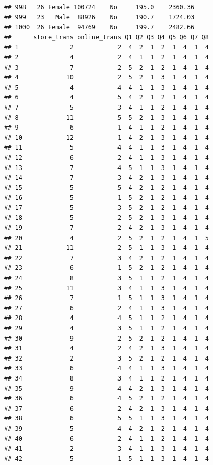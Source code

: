 \documentclass[12pt,]{krantz}
\theoremstyle{definition}
\theoremstyle{definition}
\theoremstyle{remark}
\begin{document}
\begin{verbatim}
## 998   26 Female 100724    No     195.0    2360.36
## 999   23   Male  88926    No     190.7    1724.03
## 1000  26 Female  94769    No     199.7    2482.66
##      store_trans online_trans Q1 Q2 Q3 Q4 Q5 Q6 Q7 Q8
## 1              2            2  4  2  1  2  1  4  1  4
## 2              4            2  4  1  1  2  1  4  1  4
## 3              7            2  5  2  1  2  1  4  1  4
## 4             10            2  5  2  1  3  1  4  1  4
## 5              4            4  4  1  1  3  1  4  1  4
## 6              4            5  4  2  1  2  1  4  1  4
## 7              5            3  4  1  1  2  1  4  1  4
## 8             11            5  5  2  1  3  1  4  1  4
## 9              6            1  4  1  1  2  1  4  1  4
## 10            12            1  4  2  1  3  1  4  1  4
## 11             5            4  4  1  1  3  1  4  1  4
## 12             6            2  4  1  1  3  1  4  1  4
## 13             7            4  5  1  1  3  1  4  1  4
## 14             7            3  4  2  1  3  1  4  1  4
## 15             5            5  4  2  1  2  1  4  1  4
## 16             5            1  5  2  1  2  1  4  1  4
## 17             5            3  5  2  1  2  1  4  1  4
## 18             5            2  5  2  1  3  1  4  1  4
## 19             7            2  4  2  1  3  1  4  1  4
## 20             4            2  5  2  1  2  1  4  1  5
## 21            11            2  5  1  1  3  1  4  1  4
## 22             7            3  4  2  1  2  1  4  1  4
## 23             6            1  5  2  1  2  1  4  1  4
## 24             8            3  5  1  1  2  1  4  1  4
## 25            11            3  4  1  1  3  1  4  1  4
## 26             7            1  5  1  1  3  1  4  1  4
## 27             6            2  4  1  1  3  1  4  1  4
## 28             4            4  5  1  1  2  1  4  1  4
## 29             4            3  5  1  1  2  1  4  1  4
## 30             9            2  5  2  1  2  1  4  1  4
## 31             4            2  4  2  1  3  1  4  1  4
## 32             2            3  5  2  1  2  1  4  1  4
## 33             6            4  4  1  1  3  1  4  1  4
## 34             8            3  4  1  1  2  1  4  1  4
## 35             9            4  4  2  1  3  1  4  1  4
## 36             6            4  5  2  1  2  1  4  1  4
## 37             6            2  4  2  1  3  1  4  1  4
## 38             6            5  5  1  1  3  1  4  1  4
## 39             5            4  4  2  1  2  1  4  1  4
## 40             6            2  4  1  1  2  1  4  1  4
## 41             2            3  4  1  1  3  1  4  1  4
## 42             5            1  5  1  1  3  1  4  1  4

\end{verbatim}
\end{document}
